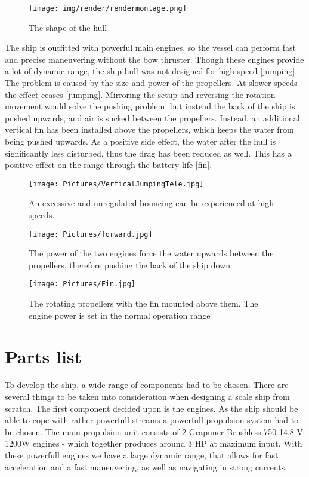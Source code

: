 \begin{figure}[hullshape]
	\centering
	\texttt{[image: img/render/rendermontage.png]}
	\caption{The shape of the hull}
	\label{fig:vessel-block-overview}
\end{figure}

The ship is outfitted with powerful main engines, so the vessel can perform fast and precise maneuvering without the bow thruster. Though these engines provide a lot of dynamic range, the ship hull was not designed for high speed \ref{jumping}. The problem is caused by the size and power of the propellers. At slower speeds the effect ceases \ref{jumping}.
Mirroring the setup and reversing the rotation movement would solve the pushing problem, but instead the back of the ship is pushed upwards, and air is sucked between the propellers. Instead, an additional vertical fin has been installed above the propellers, which keeps the water from being pushed upwards. As a positive side effect, the water after the hull is significantly less disturbed, thus the drag has been reduced as well. This has a positive effect on the range through the battery life \ref{fin}.

\begin{figure}[jumping]
	\centering
	\texttt{[image: Pictures/VerticalJumpingTele.jpg]}
	\caption{An excessive and unregulated bouncing can be experienced at high speeds.}
	\label{fig:vessel-block-overview}
\end{figure}

\begin{figure}[waterpushup]
	\centering
	\texttt{[image: Pictures/forward.jpg]}
	\caption{The power of the two engines force the water upwards between the propellers, therefore pushing the back of the ship down}
	\label{fig:vessel-block-overview}
\end{figure}

\begin{figure}[fin]
	\centering
	\texttt{[image: Pictures/Fin.jpg]}
	\caption{The rotating propellers with the fin mounted above them. The engine power is set in the normal operation range}
	\label{fig:vessel-block-overview}
\end{figure}

\section{Parts list}
To develop the ship, a wide range of components had to be chosen. There are several things to be taken into consideration when designing a scale ship from scratch. The first component decided upon is the engines. As the ship should be able to cope with rather powerfull streams a powerfull propulsion system had to be chosen. The main propulsion unit consists of 2 Grapuner Brushless 750 14.8 V 1200W engines - which together produces around 3 HP at maximum input. With these powerfull engines we have a large dynamic range, that allows for fast acceleration and a fast maneuvering, as well as navigating in strong currents. 

